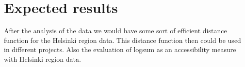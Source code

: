 \section{Expected results}

After the analysis of the data we would have some sort of efficient distance function for the Helsinki region data. This distance function then could be used in different projects. Also the evaluation of logsum as an accessibility measure with Helsinki region data.  \\